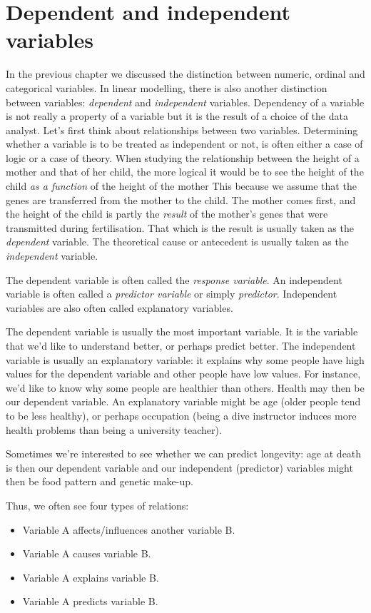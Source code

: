 \documentclass[]{book}\usepackage[]{graphicx}\usepackage[]{color}
\begin{document}
\section{Dependent and independent variables}
In the previous chapter we discussed the distinction between numeric, ordinal and categorical variables. In linear modelling, there is also another distinction between variables: \textit{dependent} and \textit{independent} variables. Dependency of a variable is not really a property of a variable but it is the result of a choice of the data analyst. Let's first think about relationships between two variables. Determining whether a variable is to be treated as independent or not, is often either a case of logic or a case of theory. When studying the relationship between the height of a mother and that of her child, the more logical it would be to see the height of the child \textit{as a function} of the height of the mother This because we assume that the genes are transferred from the mother to the child. The mother comes first, and the height of the child is partly the \textit{result} of the mother's genes that were transmitted during fertilisation. That which is the result is usually taken as the \textit{dependent} variable. The theoretical cause or antecedent is usually taken as the \textit{independent} variable. 

The dependent variable is often called the \textit{response variable}. An independent variable is often called a \textit{predictor variable} or simply \textit{predictor}. Independent variables are also often called explanatory variables.

The dependent variable is usually the most important variable. It is the variable that we'd like to understand better, or perhaps predict better. The independent variable is usually an explanatory variable: it explains why some people have high values for the dependent variable and other people have low values. For instance, we'd like to know why some people are healthier than others. Health may then be our dependent variable. An explanatory variable might be age (older people tend to be less healthy), or perhaps occupation (being a dive instructor induces more health problems than being a university teacher). 

Sometimes we're interested to see whether we can predict longevity: age at death is then our dependent variable and our independent (predictor) variables might then be food pattern and genetic make-up. 

Thus, we often see four types of relations:
\begin{itemize}
\item Variable A affects/influences another variable B.
\item Variable A causes variable B.
\item Variable A explains variable B.
\item Variable A predicts variable B.
\end{itemize}
\end{document}
